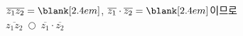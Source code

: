 $\overline{z_1z_2}=\blank[2.4em]$, $\overline{z_1}\cdot\overline{z_2}=\blank[2.4em]$이므로\\ $\overline{z_1z_2}\ \bigcirc\ \overline{z_1}\cdot\overline{z_2}$
